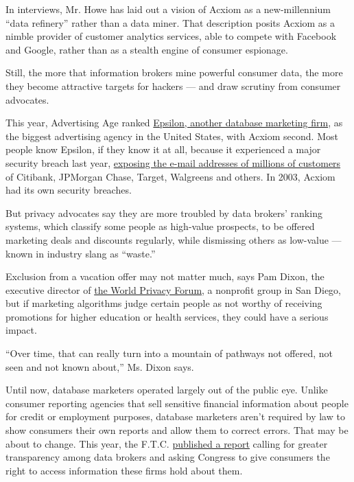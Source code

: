 In interviews, Mr. Howe has laid out a vision of Acxiom as a
new-millennium ``data refinery'' rather than a data miner. That
description posits Acxiom as a nimble provider of customer analytics
services, able to compete with Facebook and Google, rather than as a
stealth engine of consumer espionage.

Still, the more that information brokers mine powerful consumer data,
the more they become attractive targets for hackers --- and draw
scrutiny from consumer advocates.

This year, Advertising Age ranked
\href{http://www.epsilon.com/}{Epsilon, another database marketing
firm}, as the biggest advertising agency in the United States, with
Acxiom second. Most people know Epsilon, if they know it at all, because
it experienced a major security breach last year,
\href{http://www.nytimes3xbfgragh.onion/2011/04/05/business/05hack.html?_r=1}{exposing
the e-mail addresses of millions of customers} of Citibank, JPMorgan
Chase, Target, Walgreens and others. In 2003, Acxiom had its own
security breaches.

But privacy advocates say they are more troubled by data brokers'
ranking systems, which classify some people as high-value prospects, to
be offered marketing deals and discounts regularly, while dismissing
others as low-value --- known in industry slang as ``waste.''

Exclusion from a vacation offer may not matter much, says Pam Dixon, the
executive director of \href{http://www.worldprivacyforum.org/}{the World
Privacy Forum}, a nonprofit group in San Diego, but if marketing
algorithms judge certain people as not worthy of receiving promotions
for higher education or health services, they could have a serious
impact.

``Over time, that can really turn into a mountain of pathways not
offered, not seen and not known about,'' Ms. Dixon says.

Until now, database marketers operated largely out of the public eye.
Unlike consumer reporting agencies that sell sensitive financial
information about people for credit or employment purposes, database
marketers aren't required by law to show consumers their own reports and
allow them to correct errors. That may be about to change. This year,
the F.T.C.
\href{http://www.nytimes3xbfgragh.onion/2012/03/27/business/ftc-seeks-privacy-legislation.html?pagewanted=all}{published
a report} calling for greater transparency among data brokers and asking
Congress to give consumers the right to access information these firms
hold about them.

